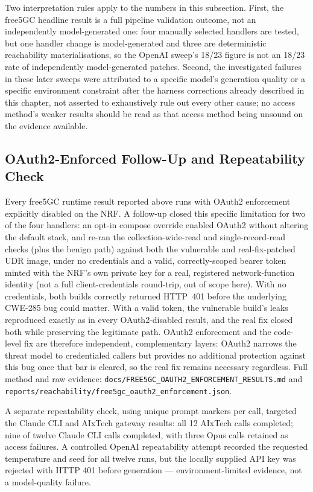 \documentclass[12pt,a4paper]{report}
\begin{document}
Two interpretation rules apply to the numbers in this subsection. First, the free5GC headline result is a full pipeline validation outcome, not an independently model-generated one: four manually selected handlers are tested, but one handler change is model-generated and three are deterministic reachability materialisations, so the OpenAI sweep's 18/23 figure is not an 18/23 rate of independently model-generated patches. Second, the investigated failures in these later sweeps were attributed to a specific model's generation quality or a specific environment constraint after the harness corrections already described in this chapter, not asserted to exhaustively rule out every other cause; no access method's weaker results should be read as that access method being unsound on the evidence available.

\subsection{OAuth2-Enforced Follow-Up and Repeatability Check}
\label{sec:final-evidence-freeze}

Every free5GC runtime result reported above runs with OAuth2 enforcement explicitly disabled on the NRF. A follow-up closed this specific limitation for two of the four handlers: an opt-in compose override enabled OAuth2 without altering the default stack, and re-ran the collection-wide-read and single-record-read checks (plus the benign path) against both the vulnerable and real-fix-patched UDR image, under no credentials and a valid, correctly-scoped bearer token minted with the NRF's own private key for a real, registered network-function identity (not a full client-credentials round-trip, out of scope here). With no credentials, both builds correctly returned HTTP~401 before the underlying CWE-285 bug could matter. With a valid token, the vulnerable build's leaks reproduced exactly as in every OAuth2-disabled result, and the real fix closed both while preserving the legitimate path. OAuth2 enforcement and the code-level fix are therefore independent, complementary layers: OAuth2 narrows the threat model to credentialed callers but provides no additional protection against this bug once that bar is cleared, so the real fix remains necessary regardless. Full method and raw evidence: \texttt{docs/FREE5GC\_OAUTH2\_ENFORCEMENT\_RESULTS.md} and \texttt{reports/reachability/free5gc\_oauth2\_enforcement.json}.

A separate repeatability check, using unique prompt markers per call, targeted the Claude CLI and AIxTech gateway results: all 12 AIxTech calls completed; nine of twelve Claude CLI calls completed, with three Opus calls retained as access failures. A controlled OpenAI repeatability attempt recorded the requested temperature and seed for all twelve runs, but the locally supplied API key was rejected with HTTP 401 before generation — environment-limited evidence, not a model-quality failure.
\end{document}
